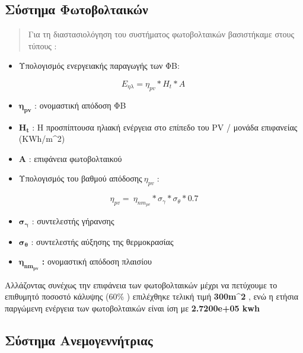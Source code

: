 \documentclass[]{article}
\begin{document}
\hypertarget{σύστημα-φωτοβολταικών}{%
\subsection{\texorpdfstring{Σύστημα Φωτοβολταικών }{Σύστημα Φωτοβολταικών }}\label{σύστημα-φωτοβολταικών}}

\begin{quote}
Για τη διαστασιολόγηση του συστήματος φωτοβολταικών βασιστήκαμε στους τύπους :
\end{quote}

\begin{itemize}
\item Υπολογισμός ενεργειακής παραγωγής των ΦΒ:
\end{itemize}

\[E_{\eta\lambda} = \eta_{pv}*H_{t}*A\ \]

\begin{itemize}
\item \(\mathbf{\eta}_{\mathbf{pv}}\) : ονομαστική απόδοση ΦΒ
\item \(\mathbf{H}_{\mathbf{t}}\) : H προσπίπτουσα ηλιακή ενέργεια στο επίπεδο του PV / μονάδα επιφανείας (KWh/m\^{}2)
\item \(\mathbf{A}\) : επιφάνεια φωτοβολταικού
\end{itemize}

\begin{itemize}
\item Υπολογισμός του βαθμού απόδοσης\({\ \eta}_{pv}\) :
\end{itemize}

\[\eta_{pv} = \ \eta_{nm_{pv}}*\sigma_{\gamma}*\sigma_{\theta}*0.7\]

\begin{itemize}
\item \(\mathbf{\sigma}_{\mathbf{\gamma}}\) : συντελεστής γήρανσης
\item \(\mathbf{\sigma}_{\mathbf{\theta}}\) : συντελεστής αύξησης της θερμοκρασίας
\item \(\mathbf{\eta}_{\mathbf{n}\mathbf{m}_{\mathbf{pv}}}\) \textbf{:} ονομαστική απόδοση πλαισίου
\end{itemize}

Αλλάζοντας συνέχως την επιφάνεια των φωτοβολταικών μέχρι να πετύχουμε το επιθυμητό ποσοστό κάλυψης (60\% ) επιλέχθηκε τελική τιμή \textbf{300m\^{}2} , ενώ η ετήσια παργώμενη ενέργεια των φωτοβολταικών είναι ίση με \textbf{2.7200e+05 kwh}

\hypertarget{σύστημα-ανεμογεννήτριας}{%
\subsection{Σύστημα Ανεμογεννήτριας}\label{σύστημα-ανεμογεννήτριας}}
\end{document}
